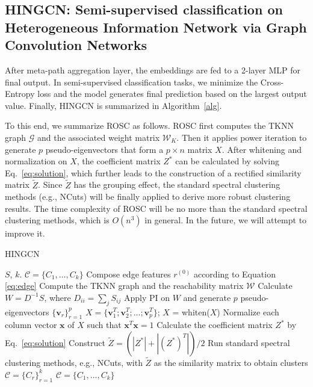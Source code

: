 \subsection{HINGCN: Semi-supervised classification on Heterogeneous Information Network via Graph Convolution Networks}
After meta-path aggregation layer, the embeddings are fed to a 2-layer MLP for final output. In semi-supervised classification tasks, we minimize the Cross-Entropy loss and the model generates final prediction based on the largest output value.
Finally, HINGCN is summarized in Algorithm~\ref{alg}.

To this end, we summarize ROSC as follows.
ROSC first computes the TKNN graph $\mathcal{G}$
and the associated weight matrix $\mathcal{W}_K$. Then it applies power iteration to generate $p$
pseudo-eigenvectors that form a $p \times n$ matrix $X$.
After whitening and normalization on $X$,
the coefficient matrix $Z^*$ can be calculated by solving Eq.~\ref{eq:solution},
which further leads to the construction of a rectified similarity matrix $\tilde{Z}$.
Since $\tilde{Z}$ has the grouping effect, 
the standard spectral clustering methods (e.g., NCuts) will be finally applied to derive more robust clustering results.
The time complexity of ROSC will be no more than the standard spectral clustering methods,
which is $O(n^3)$ in general.
In the future, we will attempt to improve it. 


\begin{algorithm}
\begin{small}
\caption{HINGCN}
\label{alg}
\begin{algorithmic}[1]
\Require $S$, $k$.
\Ensure $\mathcal{C} = \{C_1, ..., C_k\}$
\State Compose edge features $r^{(0)}$ according to Equation \ref{eq:edge}
\State Compute the TKNN graph and the reachability matrix $\mathcal{W}$
\State Calculate $W = D^{-1}S$, where $D_{ii} = \sum_jS_{ij}$
\State Apply PI on $W$ and generate $p$ pseudo-eigenvectors $\{\bm{v}_r\}_{r=1}^p$
\State $X = \{\bm{v}_1^T; \bm{v}_2^T; ...; \bm{v}_p^T\}$; $X$ = whiten($X$)
\State Normalize each column vector $\bm{x}$ of $X$ such that $\bm{x}^T\bm{x} = 1$
\State Calculate the coefficient matrix $Z^*$ by Eq.~\ref{eq:solution}
\State Construct $\tilde{Z} = (|Z^*| + |(Z^*)^T|)/2$
\State Run standard spectral clustering methods, e.g., NCuts, with $\tilde{Z}$ as the
similarity matrix to obtain clusters $\mathcal{C} = \{C_r\}_{r=1}^k$
\State \Return $\mathcal{C} = \{C_1, ..., C_k\}$
\end{algorithmic}
\end{small}
\end{algorithm}









